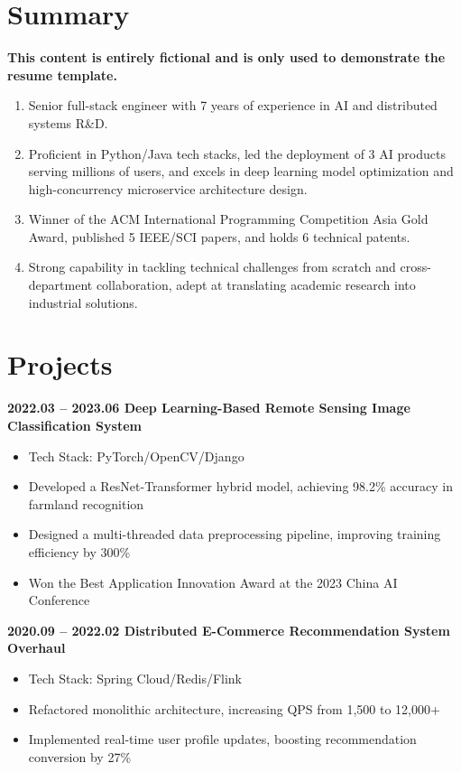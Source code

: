 \documentclass{cls/simplecv}
\begin{document}

\maketitle

\section{Summary}

\textbf{This content is entirely fictional and is only used to demonstrate the resume template.}

\begin{enumerate}
	\item Senior full-stack engineer with 7 years of experience in AI and distributed systems R\&D. 
	\item Proficient in Python/Java tech stacks, led the deployment of 3 AI products serving millions of users, and excels in deep learning model optimization and high-concurrency microservice architecture design.
	\item Winner of the ACM International Programming Competition Asia Gold Award, published 5 IEEE/SCI papers, and holds 6 technical patents.
	\item Strong capability in tackling technical challenges from scratch and cross-department collaboration, adept at translating academic research into industrial solutions.
\end{enumerate}

\section{Projects}

\textbf{2022.03 -- 2023.06 \quad Deep Learning-Based Remote Sensing Image Classification System}
\begin{itemize}
	\item Tech Stack: PyTorch/OpenCV/Django
	\item Developed a ResNet-Transformer hybrid model, achieving 98.2\% accuracy in farmland recognition
	\item Designed a multi-threaded data preprocessing pipeline, improving training efficiency by 300\%
	\item Won the Best Application Innovation Award at the 2023 China AI Conference
\end{itemize}

\textbf{2020.09 -- 2022.02 \quad Distributed E-Commerce Recommendation System Overhaul}
\begin{itemize}
	\item Tech Stack: Spring Cloud/Redis/Flink
	\item Refactored monolithic architecture, increasing QPS from 1,500 to 12,000+
	\item Implemented real-time user profile updates, boosting recommendation conversion by 27\%
\end{itemize}
\end{document}
